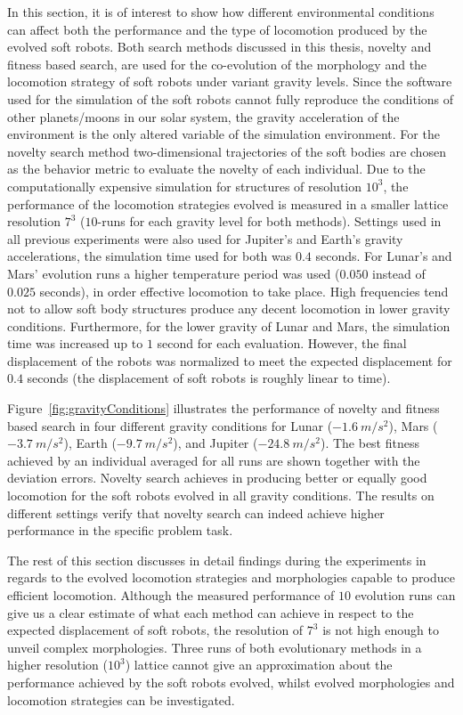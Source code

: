 In this section, it is of interest to show how different environmental conditions can affect both the performance and the type of locomotion produced by the evolved soft robots. Both search methods discussed in this thesis, novelty and fitness based search, are used for the co-evolution of the morphology and the locomotion strategy of soft robots under variant gravity levels. Since the software used for the simulation of the soft robots cannot fully reproduce the conditions of other planets/moons in our solar system, the gravity acceleration of the environment is the only altered variable of the simulation environment. For the novelty search method two-dimensional trajectories of the soft bodies are chosen as the behavior metric to evaluate the novelty of each individual. Due to the computationally expensive simulation for structures of resolution $10^3$, the performance of the locomotion strategies evolved is measured in a smaller lattice resolution $7^3$ ($10$-runs for each gravity level for both methods). Settings used in all previous experiments were also used for Jupiter's and Earth's gravity accelerations, the simulation time used for both was $0.4$ seconds. For Lunar's and Mars' evolution runs a higher temperature period was used ($0.050$ instead of $0.025$ seconds), in order effective locomotion to take place. High frequencies tend not to allow soft body structures produce any decent locomotion in lower gravity conditions. Furthermore, for the lower gravity of Lunar and Mars, the simulation time was increased up to $1$ second for each evaluation. However, the final displacement of the robots was normalized to meet the expected displacement for $0.4$ seconds (the displacement of soft robots is roughly linear to time).

Figure~\ref{fig:gravityConditions} illustrates the performance of novelty and fitness based search in four different gravity conditions for Lunar ($-1.6~m/s^2$), Mars ($-3.7~m/s^2$), Earth ($-9.7~m/s^2$), and Jupiter ($-24.8~m/s^2$). The best fitness achieved by an individual averaged for all runs are shown together with the deviation errors. Novelty search achieves in producing better or equally good locomotion for the soft robots evolved in all gravity conditions. The results on different settings verify that novelty search can indeed achieve higher performance in the specific problem task. 

The rest of this section discusses in detail findings during the experiments in regards to the evolved locomotion strategies and morphologies capable to produce efficient locomotion. Although the measured performance of $10$ evolution runs can give us a clear estimate of what each method can achieve in respect to the expected displacement of soft robots, the resolution of $7^3$ is not high enough to unveil complex morphologies. Three runs of both evolutionary methods in a higher resolution ($10^3$) lattice cannot give an approximation about the performance achieved by the soft robots evolved, whilst evolved morphologies and locomotion strategies can be investigated.



